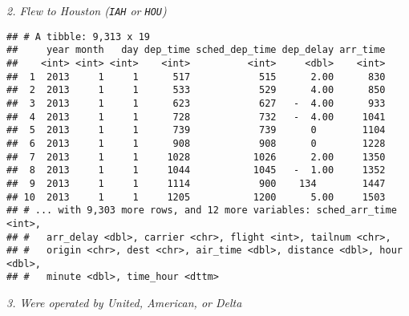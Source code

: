 \documentclass[]{article}
\newenvironment{Shaded}{\begin{snugshade}}{\end{snugshade}}
\newcommand{\KeywordTok}[1]{\textcolor[rgb]{0.13,0.29,0.53}{\textbf{#1}}}
\newcommand{\StringTok}[1]{\textcolor[rgb]{0.31,0.60,0.02}{#1}}
\newcommand{\OperatorTok}[1]{\textcolor[rgb]{0.81,0.36,0.00}{\textbf{#1}}}
\newcommand{\NormalTok}[1]{#1}
\theoremstyle{definition}
\theoremstyle{definition}
\theoremstyle{definition}
\theoremstyle{remark}
\begin{document}
\emph{2. Flew to Houston (\texttt{IAH} or \texttt{HOU})}

\begin{Shaded}
\end{Shaded}

\begin{verbatim}
## # A tibble: 9,313 x 19
##     year month   day dep_time sched_dep_time dep_delay arr_time
##    <int> <int> <int>    <int>          <int>     <dbl>    <int>
##  1  2013     1     1      517            515      2.00      830
##  2  2013     1     1      533            529      4.00      850
##  3  2013     1     1      623            627   -  4.00      933
##  4  2013     1     1      728            732   -  4.00     1041
##  5  2013     1     1      739            739      0        1104
##  6  2013     1     1      908            908      0        1228
##  7  2013     1     1     1028           1026      2.00     1350
##  8  2013     1     1     1044           1045   -  1.00     1352
##  9  2013     1     1     1114            900    134        1447
## 10  2013     1     1     1205           1200      5.00     1503
## # ... with 9,303 more rows, and 12 more variables: sched_arr_time <int>,
## #   arr_delay <dbl>, carrier <chr>, flight <int>, tailnum <chr>,
## #   origin <chr>, dest <chr>, air_time <dbl>, distance <dbl>, hour <dbl>,
## #   minute <dbl>, time_hour <dttm>
\end{verbatim}

\emph{3. Were operated by United, American, or Delta}

\begin{Shaded}
\end{Shaded}
\end{document}
